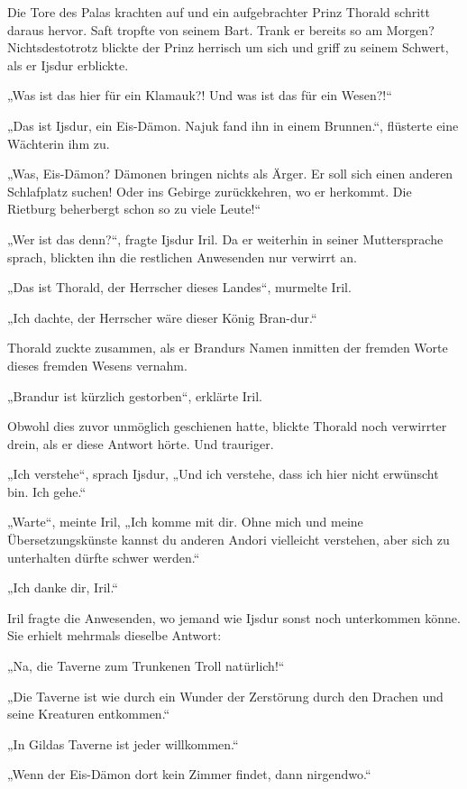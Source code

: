 Die Tore des Palas krachten auf und ein aufgebrachter Prinz Thorald schritt daraus hervor. Saft tropfte von seinem Bart. Trank er bereits so am Morgen? Nichtsdestotrotz blickte der Prinz herrisch um sich und griff zu seinem Schwert, als er Ijsdur erblickte.

„Was ist das hier für ein Klamauk?! Und was ist das für ein Wesen?!“

„Das ist Ijsdur, ein Eis-Dämon. Najuk fand ihn in einem Brunnen.“, flüsterte eine Wächterin ihm zu.

„Was, Eis-Dämon? Dämonen bringen nichts als Ärger. Er soll sich einen anderen Schlafplatz suchen! Oder ins Gebirge zurückkehren, wo er herkommt. Die Rietburg beherbergt schon so zu viele Leute!“

„Wer ist das denn?“, fragte Ijsdur Iril. Da er weiterhin in seiner Muttersprache sprach, blickten ihn die restlichen Anwesenden nur verwirrt an.

„Das ist Thorald, der Herrscher dieses Landes“, murmelte Iril.

„Ich dachte, der Herrscher wäre dieser König Bran-dur.“

Thorald zuckte zusammen, als er Brandurs Namen inmitten der fremden Worte dieses fremden Wesens vernahm.

„Brandur ist kürzlich gestorben“, erklärte Iril.

Obwohl dies zuvor unmöglich geschienen hatte, blickte Thorald noch verwirrter drein, als er diese Antwort hörte. Und trauriger.

„Ich verstehe“, sprach Ijsdur, „Und ich verstehe, dass ich hier nicht erwünscht bin. Ich gehe.“

„Warte“, meinte Iril, „Ich komme mit dir. Ohne mich und meine Übersetzungskünste kannst du anderen Andori vielleicht verstehen, aber sich zu unterhalten dürfte schwer werden.“

„Ich danke dir, Iril.“

Iril fragte die Anwesenden, wo jemand wie Ijsdur sonst noch unterkommen könne. Sie erhielt mehrmals dieselbe Antwort:

„Na, die Taverne zum Trunkenen Troll natürlich!“

„Die Taverne ist wie durch ein Wunder der Zerstörung durch den Drachen und seine Kreaturen entkommen.“

„In Gildas Taverne ist jeder willkommen.“

„Wenn der Eis-Dämon dort kein Zimmer findet, dann nirgendwo.“\bigskip







